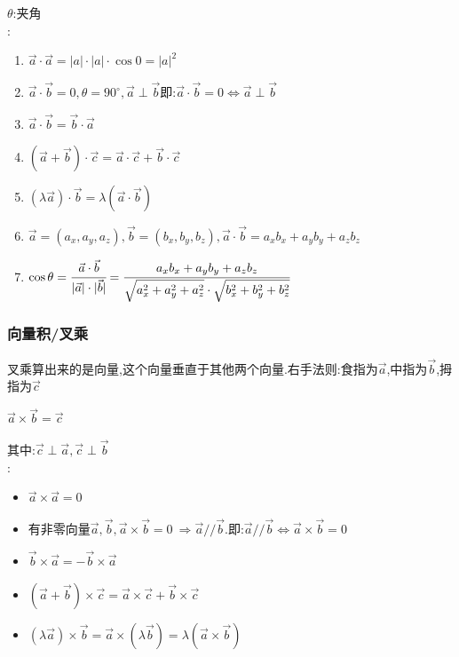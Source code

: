 \documentclass[UTF8,12pt]{ctexbook}
\newcommand{\degree}{^\circ}
\begin{document}
{{{{      $\theta$:夹角\\

      :
      \begin{enumerate}
        \item $\vec{a}\cdot\vec{a} = |a|\cdot|a|\cdot\cos0 = |a|^2$
        \item $\vec{a}\cdot\vec{b} = 0,\theta = 90\degree,\vec{a} \perp \vec{b}$\qquad 即:$\vec{a}\cdot\vec{b} = 0 \Leftrightarrow \vec{a} \perp \vec{b}$
        \item $\vec{a}\cdot\vec{b} = \vec{b}\cdot\vec{a}$
        \item $(\vec{a}+\vec{b})\cdot\vec{c} = \vec{a}\cdot\vec{c} + \vec{b}\cdot\vec{c}$
        \item $(\lambda\vec{a})\cdot\vec{b} = \lambda(\vec{a}\cdot\vec{b})$
        \item $\vec{a} = (a_x,a_y,a_z),\vec{b} = (b_x,b_y,b_z),\vec{a}\cdot\vec{b} = a_xb_x + a_yb_y + a_zb_z$
        \item $\cos\theta = \cfrac{\vec{a}\cdot\vec{b}}{|\vec{a}|\cdot|\vec{b}|} = \cfrac{a_xb_x + a_yb_y + a_zb_z}{\sqrt{a_x^2 + a_y^2 + a_z^2}\cdot\sqrt{b_x^2 + b_y^2 + b_z^2}}$
      \end{enumerate}

    }%

    \subsubsection{向量积/叉乘}{
      叉乘算出来的是向量,这个向量垂直于其他两个向量.右手法则:食指为$\vec{a}$,中指为$\vec{b}$,拇指为$\vec{c}$

      $\vec{a}\times\vec{b} = \vec{c}$

      其中:$\vec{c}\perp\vec{a},\vec{c}\perp\vec{b}$\\

      :
      \begin{itemize}
        \item $\vec{a}\times\vec{a} = 0$
        \item 有非零向量$\vec{a},\vec{b},\vec{a}\times\vec{b} = 0\ \Rightarrow \vec{a} // \vec{b}$.即:$\vec{a} // \vec{b} \Leftrightarrow \vec{a} \times \vec{b} = 0$
        \item $\vec{b}\times\vec{a} = -\vec{b}\times\vec{a}$
        \item $(\vec{a} + \vec{b})\times\vec{c} = \vec{a} \times \vec{c} + \vec{b} \times \vec{c}$
        \item $(\lambda\vec{a})\times\vec{b} = \vec{a} \times (\lambda\vec{b}) = \lambda(\vec{a}\times\vec{b})$
      \end{itemize}

}}}}
\end{document}

